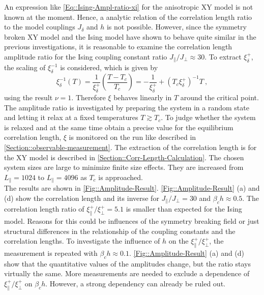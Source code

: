 	An expression like \eqref{Eq::Ising-Ampl-ratio-xi} for the anisotropic XY model is not known at the moment. Hence, a analytic relation of the correlation length ratio to the model couplings $J_\delta$ and $h$ is not possible. However, since the symmetry broken XY model and the Ising model have shown to behave quite similar in the previous investigations, it is reasonable to examine the correlation length amplitude ratio for the Ising coupling constant ratio $J_\parallel /	J_\perp \approx	30$. To extract $\xi^+_\delta$, the scaling of $\xi_\delta^{-1}$ is considered, which is given by
	\begin{equation} \label{Eq::inv-divergence-fit}
		\xi_\delta^{-1}(T) =	\frac{1}{\xi_\delta^+} \left(\frac{T - T_c}{T_c}\right) =	- \frac{1}{\xi_\delta^+} + (T_c \xi_\delta^+)^{-1} T ~,
	\end{equation}
	using the result $\nu =	1$. Therefore $\xi$ behaves linearly in $T$ around the critical point.\\
	
	The amplitude ratio is investigated by preparing the system in a random state and letting it relax at a fixed temperatures $T \gtrsim T_c$. To judge whether the system is relaxed and at the same time obtain a precise value for the equilibrium correlation length, $\xi$ is monitored on the run like described in \autoref{Section::observable-measurement}. The extraction of the correlation length is for the XY model is described in \autoref{Section::Corr-Length-Calculation}. The chosen system sizes are large to minimize finite size effects. They are increased from $L_\parallel =	1024$ to $L_\parallel =	4096$ as $T_c$ is approached. \\

	The results are shown in \autoref{Fig::Amplitude-Result}. \autoref{Fig::Amplitude-Result} (a) and (d) show the correlation length and its inverse for $J_\parallel /	J_\perp =	30$ and $\beta_c h \approx 0.5$. The correlation length ratio of $\xi_\parallel^+ /   \xi_\perp^+ = 5.1 $ is smaller than expected for the Ising model. Reasons for this could be influences of the symmetry breaking field or just structural differences in the relationship of the coupling constants and the correlation lengths. To investigate the influence of $h$ on the $\xi_\parallel^+ /   \xi_\perp^+$, the measurement is repeated with $\beta_c h \approx 0.1$. \autoref{Fig::Amplitude-Result} (a) and (d) show that the quantitative values of the amplitudes change, but the ratio stays virtually the same. More measurements are needed to exclude a dependence of $\xi^+_\parallel /	\xi^+_\perp$ on $\beta_c h$. However, a strong dependency can already be ruled out. \\
	
